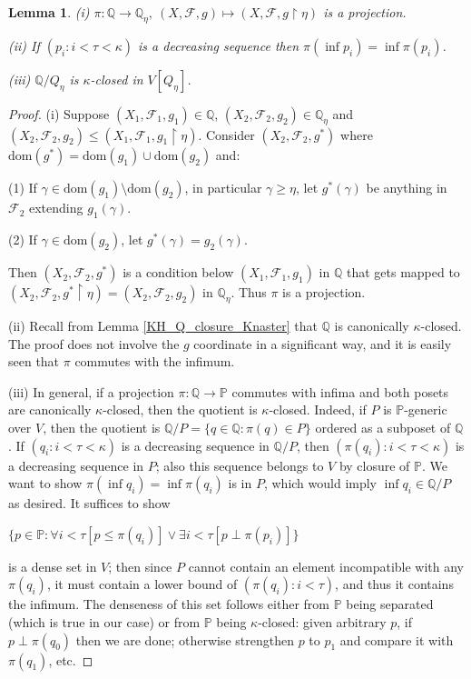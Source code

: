 \documentclass[10pt,reqno]{amsart}
\theoremstyle{plain}
\newtheorem{lemma}[theorem]{Lemma}
\theoremstyle{definition}
\theoremstyle{remark}
\begin{document}
\begin{lemma}\label{KH_Q_projection}
(i) $\pi:\mathbb{Q}\rightarrow\mathbb{Q}_\eta,\ (X,\mathcal{F},g)\mapsto(X,\mathcal{F},g\upharpoonright\eta)$ is a projection. 

(ii) If $(p_i:i<\tau<\kappa)$ is a decreasing sequence then $\pi(\inf p_i)=\inf\pi(p_i)$.

(iii) $\mathbb{Q}/Q_\eta$ is $\kappa$-closed in $V[Q_\eta]$.
\end{lemma}
\begin{proof}
(i) Suppose $(X_1,\mathcal{F}_1,g_1)\in\mathbb{Q}$, $(X_2,\mathcal{F}_2,g_2)\in\mathbb{Q}_\eta$ and $(X_2,\mathcal{F}_2,g_2)\leq(X_1,\mathcal{F}_1,g_1\upharpoonright\eta)$. Consider $(X_2,\mathcal{F}_2,g^*)$ where $\mathrm{dom}(g^*)=\mathrm{dom}(g_1)\cup\mathrm{dom}(g_2)$ and:

(1) If $\gamma\in\mathrm{dom}(g_1)\setminus\mathrm{dom}(g_2)$, in particular $\gamma\geq\eta$, let $g^*(\gamma)$ be anything in $\mathcal{F}_2$ extending $g_1(\gamma)$.

(2) If $\gamma\in\mathrm{dom}(g_2)$, let $g^*(\gamma)=g_2(\gamma)$.

Then $(X_2,\mathcal{F}_2,g^*)$ is a condition below $(X_1,\mathcal{F}_1,g_1)$ in $\mathbb{Q}$ that gets mapped to $(X_2,\mathcal{F}_2,g^*\upharpoonright\eta)=(X_2,\mathcal{F}_2,g_2)$ in $\mathbb{Q}_\eta$. Thus $\pi$ is a projection.

(ii) Recall from Lemma \ref{KH_Q_closure_Knaster} that $\mathbb{Q}$ is canonically $\kappa$-closed. The proof does not involve the $g$ coordinate in a significant way, and it is easily seen that $\pi$ commutes with the infimum.

(iii) In general, if a projection $\pi:\mathbb{Q}\rightarrow\mathbb{P}$ commutes with infima and both posets are canonically $\kappa$-closed, then the quotient is $\kappa$-closed. Indeed, if $P$ is $\mathbb{P}$-generic over $V$, then the quotient is $\mathbb{Q}/P=\{q\in\mathbb{Q}:\pi(q)\in P\}$ ordered as a subposet of $\mathbb{Q}$. If $(q_i:i<\tau<\kappa)$ is a decreasing sequence in $\mathbb{Q}/P$, then $(\pi(q_i):i<\tau<\kappa)$ is a decreasing sequence in $P$; also this sequence belongs to $V$ by closure of $\mathbb{P}$. We want to show $\pi(\inf q_i)=\inf\pi(q_i)$ is in $P$, which would imply $\inf q_i\in\mathbb{Q}/P$ as desired. It suffices to show 

\begin{center}
$\{p\in\mathbb{P}:\forall i<\tau[p\leq \pi(q_i)]\lor\exists i<\tau[p\perp \pi(p_i)]\}$
\end{center}

is a dense set in $V$; then since $P$ cannot contain an element incompatible with any $\pi(q_i)$, it must contain a lower bound of $(\pi(q_i):i<\tau)$, and thus it contains the infimum. The denseness of this set follows either from $\mathbb{P}$ being separated (which is true in our case) or from $\mathbb{P}$ being $\kappa$-closed: given arbitrary $p$, if $p\perp \pi(q_0)$ then we are done; otherwise strengthen $p$ to $p_1$ and compare it with $\pi(q_1)$, etc.
\end{proof}
\end{document}
